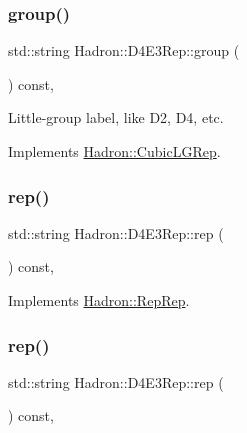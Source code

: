 \subsubsection{\texorpdfstring{group()}{group()}\hspace{0.1cm}{\footnotesize\ttfamily [3/3]}}
{\footnotesize\ttfamily std\+::string Hadron\+::\+D4\+E3\+Rep\+::group (\begin{DoxyParamCaption}{ }\end{DoxyParamCaption}) const\hspace{0.3cm}{\ttfamily [inline]}, {\ttfamily [virtual]}}

Little-\/group label, like D2, D4, etc. 

Implements \mbox{\hyperlink{structHadron_1_1CubicLGRep_a9bdb14b519a611d21379ed96a3a9eb41}{Hadron\+::\+Cubic\+L\+G\+Rep}}.

\mbox{\label{structHadron_1_1D4E3Rep_aee1429ccf3e674cb3d5bad78d15a0e33}} 
\subsubsection{\texorpdfstring{rep()}{rep()}\hspace{0.1cm}{\footnotesize\ttfamily [1/3]}}
{\footnotesize\ttfamily std\+::string Hadron\+::\+D4\+E3\+Rep\+::rep (\begin{DoxyParamCaption}{ }\end{DoxyParamCaption}) const\hspace{0.3cm}{\ttfamily [inline]}, {\ttfamily [virtual]}}



Implements \mbox{\hyperlink{structHadron_1_1RepRep_ab3213025f6de249f7095892109575fde}{Hadron\+::\+Rep\+Rep}}.

\mbox{\label{structHadron_1_1D4E3Rep_aee1429ccf3e674cb3d5bad78d15a0e33}} 
\subsubsection{\texorpdfstring{rep()}{rep()}\hspace{0.1cm}{\footnotesize\ttfamily [2/3]}}
{\footnotesize\ttfamily std\+::string Hadron\+::\+D4\+E3\+Rep\+::rep (\begin{DoxyParamCaption}{ }\end{DoxyParamCaption}) const\hspace{0.3cm}{\ttfamily [inline]}, {\ttfamily [virtual]}}



